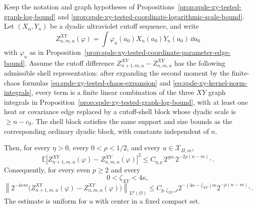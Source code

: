 \begin{proposition}
\label{prop:spde-xy-tested-coordinate-cutoff-shell-gain}
Keep the notation and graph hypotheses of
Propositions~\ref{prop:spde-xy-tested-graph-log-bound} and
\ref{prop:spde-xy-tested-coordinate-logarithmic-scale-bound}.  Let
\((X_n,Y_n)\) be a dyadic ultraviolet cutoff sequence, and write
\[
  Z_{n,m,u}^{XY}(\varphi)
  =
  \int\varphi_u(a_0)X_n(a_0)Y_n(a_0)\,\dd a_0
\]
with \(\varphi_u\) as in
Proposition~\ref{prop:spde-xy-tested-coordinate-parameter-edge-bound}.
Assume the cutoff difference \(Z_{n+1,m,u}^{XY}-Z_{n,m,u}^{XY}\) has the
following admissible shell representation: after expanding the second moment
by the finite-chaos formulas
\eqref{eq:spde-xy-tested-chaos-expansion} and
\eqref{eq:spde-xy-kernel-norm-integrals}, every term is a finite linear
combination of the three \(XY\) graph integrals in
Proposition~\ref{prop:spde-xy-tested-graph-log-bound}, with at least one
heat or covariance edge replaced by a cutoff-shell block whose dyadic scale
is \(\geq n-c_0\).  The shell block satisfies the same support and size
bounds as the corresponding ordinary dyadic block, with constants independent
of \(n\).

Then, for every \(\eta>0\), every \(0<\rho<1/2\), and every
\(u\in\mathcal X_{\Pi,m}\),
\begin{equation}
  \mathbb E
  \left|
    Z_{n+1,m,u}^{XY}(\varphi)-Z_{n,m,u}^{XY}(\varphi)
  \right|^2
  \leq
  C_{\eta,\rho}\,
  2^{\eta m}\,
  2^{-2\rho(n-m)_+}.
  \label{eq:spde-xy-tested-coordinate-cutoff-shell-l2}
\end{equation}
Consequently, for every even \(p\geq2\) and every
\[
  0<\zeta_{XY}<4\kappa ,
\]
\begin{equation}
  \left\|
    2^{-4\kappa m}
    \bigl(
      Z_{n+1,m,u}^{XY}(\varphi)-Z_{n,m,u}^{XY}(\varphi)
    \bigr)
  \right\|_{L^p(\Omega)}
  \leq
  C_{p,\zeta_{XY},\rho}
  2^{-(4\kappa-\zeta_{XY})m}
  2^{-\rho(n-m)_+}.
  \label{eq:spde-xy-tested-coordinate-cutoff-shell-normalized}
\end{equation}
The estimate is uniform for \(u\) with center in a fixed compact set.
\end{proposition}

